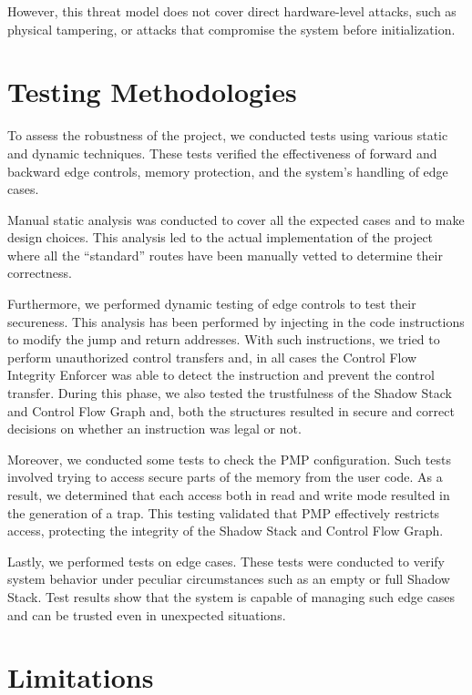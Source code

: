 However, this threat model does not cover direct hardware-level attacks, such as
physical tampering, or attacks that compromise the system before initialization.

\section{Testing Methodologies}
\label{sec:ta_methodologies}

To assess the robustness of the project, we conducted tests using various static
and dynamic techniques. These tests verified the effectiveness of forward and
backward edge controls, memory protection, and the system's handling of edge
cases.

Manual static analysis was conducted to cover all the expected cases and to make
design choices. This analysis led to the actual implementation of the project where
all the ``standard'' routes have been manually vetted to determine their correctness.

Furthermore, we performed dynamic testing of edge controls to test their
secureness. This analysis has been performed by injecting in the code instructions
to modify the jump and return addresses. With such instructions, we tried to perform
unauthorized control transfers and, in all cases the Control Flow Integrity
Enforcer was able to detect the instruction and prevent the control transfer. During
this phase, we also tested the trustfulness of the Shadow Stack and Control Flow
Graph and, both the structures resulted in secure and correct decisions on whether
an instruction was legal or not.

Moreover, we conducted some tests to check the PMP configuration. Such tests involved
trying to access secure parts of the memory from the user code. As a result, we determined
that each access both in read and write mode resulted in the generation of a trap.
This testing validated that PMP effectively restricts access, protecting the integrity
of the Shadow Stack and Control Flow Graph.

Lastly, we performed tests on edge cases. These tests were conducted to verify system
behavior under peculiar circumstances such as an empty or full Shadow Stack.
Test results show that the system is capable of managing such edge cases and can
be trusted even in unexpected situations.

\section{Limitations}
\label{sec:ta_limitations}

